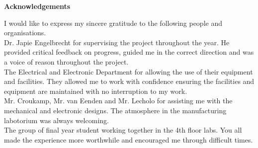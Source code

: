 \begin{center}
\textbf{\Large Acknowledgements}
\end{center}

I would like to express my sincere gratitude to the following people
and organisations.\\

Dr. Japie Engelbrecht for supervising the project throughout the year. He provided critical feedback on progress, guided me in the correct direction and was a voice of reason throughout the project.\\

The Electrical and Electronic Department for allowing the use of their equipment and facilities. They allowed me to work with confidence ensuring the facilities and equipment are maintained with no interruption to my work.\\

Mr$.$ Croukamp, Mr$.$ van Eenden and Mr$.$ Lecholo for assisting me with the mechanical and electronic designs. The atmosphere in the manufacturing labotorium was always welcoming.\\

The group of final year student working together in the 4th floor labs. You all made the experience more worthwhile and encouraged me through  difficult times. 

\newpage

\begin{comment}
\chapter{Dedications}%
\vfill
\begin{Afr}
\begin{center}\itshape
Hierdie verslag word opgedra aan my ouers wat my ondersteun het tydens die 4 jaar om die graad van ingenieurswese te ontvang en die Here vir sy genade. 
\end{center}
\end{Afr}
\vfill
\clearpage

\end{comment}

\endinput
